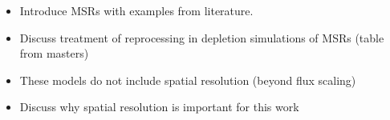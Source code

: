 \begin{itemize}
    \item Introduce MSRs with examples from literature.
    \item Discuss treatment of reprocessing in depletion simulations of MSRs (table from masters)
    \item These models do not include spatial resolution (beyond flux scaling)
    \item Discuss why spatial resolution is important for this work
\end{itemize}

